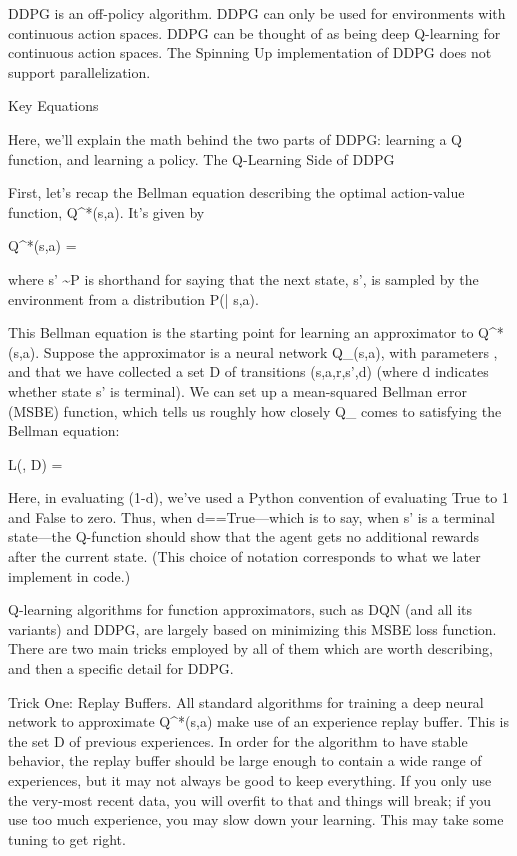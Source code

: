     DDPG is an off-policy algorithm.
    DDPG can only be used for environments with continuous action spaces.
    DDPG can be thought of as being deep Q-learning for continuous action spaces.
    The Spinning Up implementation of DDPG does not support parallelization.

Key Equations

Here, we'll explain the math behind the two parts of DDPG: learning a Q function, and learning a policy.
The Q-Learning Side of DDPG

First, let's recap the Bellman equation describing the optimal action-value function, Q^*(s,a). It's given by

Q^*(s,a) = 

where s' \sim P is shorthand for saying that the next state, s', is sampled by the environment from a distribution P(\cdot| s,a).

This Bellman equation is the starting point for learning an approximator to Q^*(s,a). Suppose the approximator is a neural network Q_{\phi}(s,a), with parameters \phi, and that we have collected a set {\mathcal D} of transitions (s,a,r,s',d) (where d indicates whether state s' is terminal). We can set up a mean-squared Bellman error (MSBE) function, which tells us roughly how closely Q_{\phi} comes to satisfying the Bellman equation:

L(\phi, {\mathcal D}) = 

Here, in evaluating (1-d), we've used a Python convention of evaluating True to 1 and False to zero. Thus, when d==True---which is to say, when s' is a terminal state---the Q-function should show that the agent gets no additional rewards after the current state. (This choice of notation corresponds to what we later implement in code.)

Q-learning algorithms for function approximators, such as DQN (and all its variants) and DDPG, are largely based on minimizing this MSBE loss function. There are two main tricks employed by all of them which are worth describing, and then a specific detail for DDPG.

Trick One: Replay Buffers. All standard algorithms for training a deep neural network to approximate Q^*(s,a) make use of an experience replay buffer. This is the set {\mathcal D} of previous experiences. In order for the algorithm to have stable behavior, the replay buffer should be large enough to contain a wide range of experiences, but it may not always be good to keep everything. If you only use the very-most recent data, you will overfit to that and things will break; if you use too much experience, you may slow down your learning. This may take some tuning to get right.

